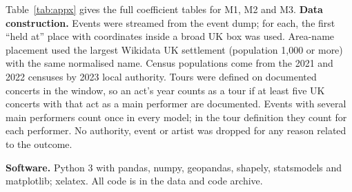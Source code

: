 \documentclass[11pt,a4paper]{article}
\begin{document}
Table~\ref{tab:appx} gives the full coefficient tables for M1, M2 and M3. \textbf{Data construction.} Events were streamed from the event dump; for each, the first ``held at'' place with coordinates inside a broad UK box was used. Area-name placement used the largest Wikidata UK settlement (population 1,000 or more) with the same normalised name. Census populations come from the 2021 and 2022 censuses by 2023 local authority. Tours were defined on documented concerts in the window, so an act's year counts as a tour if at least five UK concerts with that act as a main performer are documented. Events with several main performers count once in every model; in the tour definition they count for each performer. No authority, event or artist was dropped for any reason related to the outcome.

\textbf{Software.} Python 3 with pandas, numpy, geopandas, shapely, statsmodels and matplotlib; xelatex. All code is in the data and code archive.
\end{document}
